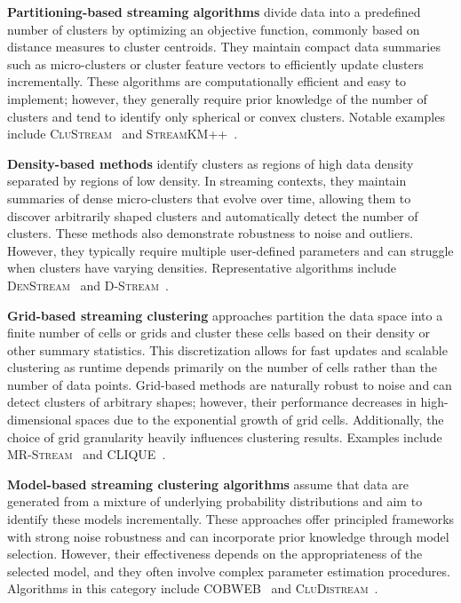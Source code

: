 \textbf{Partitioning-based streaming algorithms} divide data into a predefined number of clusters
by optimizing an objective function, commonly based on distance measures to cluster centroids. They
maintain compact data summaries such as micro-clusters or cluster feature vectors to efficiently update
clusters incrementally. These algorithms are computationally efficient and easy to implement; however,
they generally require prior knowledge of the number of clusters and tend to identify only spherical
or convex clusters. Notable examples include \textsc{CluStream}~\cite{clustream} and
\textsc{StreamKM++}~\cite{stream_km_plus_plus}.

\textbf{Density-based methods} identify clusters as regions of high data density separated by
regions of low density. In streaming contexts, they maintain summaries of dense micro-clusters
that evolve over time, allowing them to discover arbitrarily shaped clusters and automatically
detect the number of clusters. These methods also demonstrate robustness to noise and outliers.
However, they typically require multiple user-defined parameters and can struggle when clusters
have varying densities. Representative algorithms include \textsc{DenStream}~\cite{denstream}
and \textsc{D-Stream}~\cite{d_stream}.

\textbf{Grid-based streaming clustering} approaches partition the data space into a finite number
of cells or grids and cluster these cells based on their density or other summary statistics. This
discretization allows for fast updates and scalable clustering as runtime depends primarily on the
number of cells rather than the number of data points. Grid-based methods are naturally robust to
noise and can detect clusters of arbitrary shapes; however, their performance decreases in high-dimensional
spaces due to the exponential growth of grid cells. Additionally, the choice of grid granularity heavily
influences clustering results. Examples include \textsc{MR-Stream}~\cite{mr_stream}
and \textsc{CLIQUE}~\cite{clique}.

\textbf{Model-based streaming clustering algorithms} assume that data are generated from a mixture of
underlying probability distributions and aim to identify these models incrementally. These approaches
offer principled frameworks with strong noise robustness and can incorporate prior knowledge through
model selection. However, their effectiveness depends on the appropriateness of the selected model,
and they often involve complex parameter estimation procedures. Algorithms in this category include
\textsc{COBWEB}~\cite{cobweb} and \textsc{CluDistream}~\cite{cludistream}.

